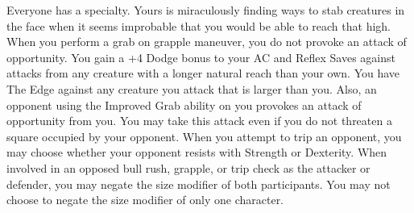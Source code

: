 {Everyone has a specialty. Yours is miraculously finding ways to stab creatures in the face when it seems improbable that you would be able to reach that high.}
{When you perform a grab on grapple maneuver, you do not provoke an attack of opportunity.}
{You gain a +4 Dodge bonus to your AC and Reflex Saves against attacks from any creature with a longer natural reach than your own.}
{You have The Edge against any creature you attack that is larger than you. Also, an opponent using the Improved Grab ability on you provokes an attack of opportunity from you. You may take this attack even if you do not threaten a square occupied by your opponent.}
{When you attempt to trip an opponent, you may choose whether your opponent resists with Strength or Dexterity.}
{When involved in an opposed bull rush, grapple, or trip check as the attacker or defender, you may negate the size modifier of both participants. You may not choose to negate the size modifier of only one character.}